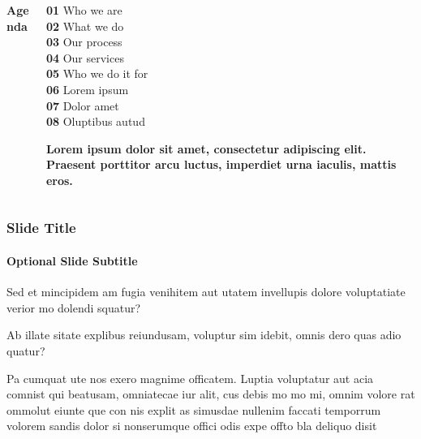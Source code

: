 \documentclass[
	aspectratio=169, %
	t, %
	onlytextwidth, %
	10pt, %
]{beamer}
\begin{document}
	\begin{frame}
		\begin{columns}[T] %
			\begin{column}{0.48\linewidth} %
				\HUGE\textbf{Agenda}
			\end{column}
			\begin{column}{0.48\linewidth} %
				\textbf{01} Who we are\\ %
				\textbf{02} What we do\\
				\textbf{03} Our process\\
				\textbf{04} Our services\\
				\textbf{05} Who we do it for\\
				\textbf{06} Lorem ipsum\\
				\textbf{07} Dolor amet\\
				\textbf{08} Oluptibus autud
				
				\textbf{Lorem ipsum dolor sit amet, consectetur adipiscing elit. Praesent porttitor arcu luctus, imperdiet urna iaculis, mattis eros.}
			\end{column}
		\end{columns}
	\end{frame}
\endgroup


\begin{frame}
	\frametitle{Slide Title}
	\framesubtitle{Optional Slide Subtitle}
	
	\begin{adjustwidth}{0cm}{0.35\textwidth} %
		Sed et mincipidem am fugia venihitem aut utatem invellupis dolore voluptatiate verior mo dolendi squatur?

		Ab illate sitate explibus reiundusam, voluptur sim idebit, omnis dero quas adio quatur?

		Pa cumquat ute nos exero magnime officatem. Luptia voluptatur aut acia comnist qui beatusam, omniatecae iur alit, cus debis mo mo mi, omnim volore rat ommolut eiunte que con nis explit as simusdae nullenim faccati temporrum volorem sandis dolor si nonserumque offici odis expe offto bla deliquo disit
	\end{adjustwidth}
\end{frame}
\end{document}
